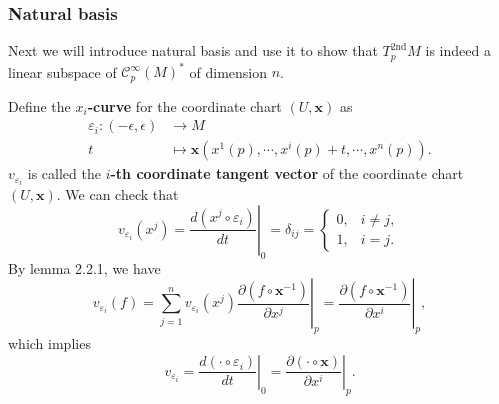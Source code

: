 \documentclass{report}
\begin{document}
\subsubsection{Natural basis}
Next we will introduce natural basis and use it to show that $T^{2\mathrm{nd}}_pM$ is indeed a linear subspace of $\mathcal{C}^{\infty}_p(M)^*$ of dimension $n$.



\noindent Define the \textbf{$x_i$-curve} for the coordinate chart $(U,\mathbf{x})$ as
\[
    \begin{aligned}
        \varepsilon_i:(-\epsilon,\epsilon)&\longrightarrow M\\
        t&\longmapsto\mathbf{x}\left(x^1(p),\cdots,{x}^i(p)+t,\cdots,x^n(p)\right).
    \end{aligned}
\]
$v_{\varepsilon_i}$ is called the \textbf{$i$-th coordinate tangent vector} of the coordinate chart $(U,\mathbf{x})$.
We can check that
\[
    v_{\varepsilon_i}\left( x^j\right)=\left.\frac{d( x^j\circ\varepsilon_i)}{dt}\right|_0=\delta_{ij}=\begin{cases}
        0,& i\ne j,\\
        1,& i=j.
        \end{cases}
\]
By lemma 2.2.1, we have
\[
    v_{\varepsilon_i}(f)=\sum_{j=1}^n v_{\varepsilon_i}( x^j) \left.\frac{\partial (f\circ \mathbf{x}^{-1})}{\partial x^j}\right|_{p}=\left.\frac{\partial (f\circ \mathbf{x}^{-1})}{\partial x^i}\right|_{p},
\]
which implies 
\[
    v_{\varepsilon_i}=\left.\frac{d(\cdot \circ\varepsilon_i)}{dt}\right|_0=\left.\frac{\partial (\cdot \circ \mathbf{x})}{\partial x^i}\right|_{p}.
\]
\end{document}
